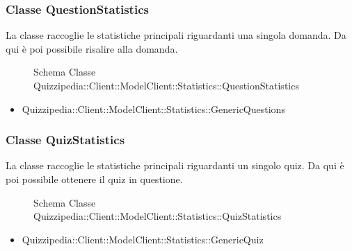 \subsubsection{Classe QuestionStatistics}
La classe raccoglie le statistiche principali riguardanti una singola domanda. Da qui è poi possibile risalire alla domanda.
\begin{figure}[H]
\centering
\noindent{}
\caption{Schema Classe Quizzipedia::Client::ModelClient::Statistics::QuestionStatistics}
\end{figure}
\begin{itemize}
\item Quizzipedia::Client::ModelClient::Statistics::GenericQuestions
\end{itemize}
\subsubsection{Classe QuizStatistics}
La classe raccoglie le statistiche principali riguardanti un singolo quiz. Da qui è poi possibile ottenere il quiz in questione.
\begin{figure}[H]
\centering
\noindent{}
\caption{Schema Classe Quizzipedia::Client::ModelClient::Statistics::QuizStatistics}
\end{figure}
\begin{itemize}
\item Quizzipedia::Client::ModelClient::Statistics::GenericQuiz
\end{itemize}
